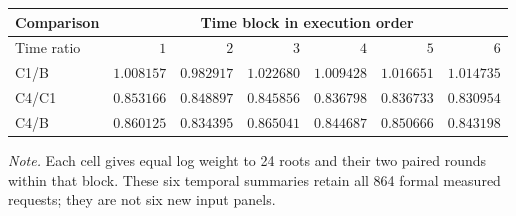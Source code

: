 \begingroup
\fontsize{8.7}{10.5}\selectfont
\setlength{\tabcolsep}{3.0pt}\renewcommand{\arraystretch}{1.03}
\noindent
\begin{tabularx}{\linewidth}{@{}>{\raggedright\arraybackslash}Xrrrrrr@{}}
\toprule
Comparison & \multicolumn{6}{c}{Time block in execution order}\\
\cmidrule(lr){2-7}
Time ratio & $1$ & $2$ & $3$ & $4$ & $5$ & $6$\\
\midrule
C1/B & $1.008157$ & $0.982917$ & $1.022680$ & $1.009428$ & $1.016651$ & $1.014735$\\
C4/C1 & $0.853166$ & $0.848897$ & $0.845856$ & $0.836798$ & $0.836733$ & $0.830954$\\
C4/B & $0.860125$ & $0.834395$ & $0.865041$ & $0.844687$ & $0.850666$ & $0.843198$\\
\bottomrule
\end{tabularx}
\par\smallskip
\fontsize{8}{9.6}\selectfont\raggedright
\textit{Note.} Each cell gives equal log weight to 24 roots and their two paired rounds within that block. These six temporal summaries retain all 864 formal measured requests; they are not six new input panels.
\par\endgroup
